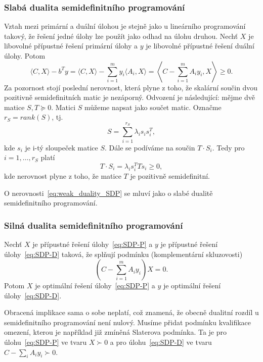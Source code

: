 \subsubsection*{Slabá dualita semidefinitního programování}

Vztah mezi primární a duální úlohou je stejně jako u lineárního programování takový, že řešení jedné úlohy lze použít jako odhad na úlohu druhou. Nechť $X$ je libovolné přípustné řešení primární úlohy a $y$ je libovolné přípustné řešení duální úlohy. Potom
\begin{equation}
    \langle C, X \rangle - b^T y =
    \langle C, X \rangle - \sum_{i=1}^m y_i \langle A_i, X \rangle =
    \left\langle C - \sum_{i=1}^m A_i y_i, X \right\rangle \geq 0.
    \label{eq:weak_duality_SDP}
\end{equation}
Za pozornost stojí poslední nerovnost, která plyne z toho, že skalární součin dvou pozitivně semidefinitních matic je nezáporný. Odvození je následující: mějme dvě matice $S, T \succeq 0$. Matici $S$ můžeme napsat jako součet  matic. Označme $r_S = rank(S)$, tj.
$$
    S = \sum_{i=1}^{r_S} \lambda_i s_i s_i^T,
$$
kde $s_i$ je i-tý sloupeček matice $S$.
Dále se podíváme na součin $T \cdot S_i$. Tedy pro $i = 1, \dots, r_S$ platí
$$
    T \cdot S_i = \lambda_i s_i^T T s_i \geq 0,
$$
kde nerovnost plyne z toho, že matice $T$ je pozitivně semidefinitní.

O nerovnosti~\ref{eq:weak_duality_SDP} se mluví jako o slabé dualitě semidefinitního programování.

\subsubsection*{Silná dualita semidefinitního programování}

\begin{vt}
    Nechť $X$ je přípustné řešení úlohy~\ref{eq:SDP-P} a $y$ je přípustné řešení úlohy~\ref{eq:SDP-D} taková, že splňují podmínku (komplementární skluzovosti)
    $$
        \left( C - \sum_{i=1}^m A_i y_i \right) X = 0.
    $$
    Potom $X$ je optimální řešení úlohy~\ref{eq:SDP-P} a $y$ je optimální řešení úlohy~\ref{eq:SDP-D}.
\end{vt}

Obracená implikace sama o sobe neplatí, což znamená, že obecně dualitní rozdíl u semidefinitního programování není nulový. Musíme přidat podmínku kvalifikace omezení, kterou je například již zmíněná Slaterova podmínka. Ta je pro úlohu~\ref{eq:SDP-P} ve tvaru $X \succ 0$ a pro úlohu~\ref{eq:SDP-D} ve tvaru $C - \sum_i A_i y_i \succ 0$.

